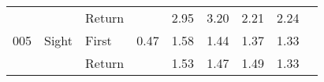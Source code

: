 \begin{table}[!htb]
\begin{tabular}{lllrrrrrr}
    &       & Return &          &   2.95 &                                                  3.20 &                                                   2.21 &    2.24 \\
005 & Sight & First &     0.47 &   1.58 &                                                  1.44 &                                                   1.37 &    1.33 \\
    &       & Return &          &   1.53 &                                                  1.47 &                                                   1.49 &    1.33 \\
\bottomrule
\end{tabular}
\end{table}

